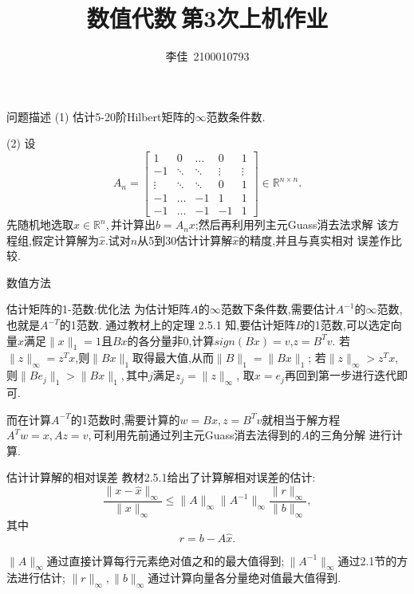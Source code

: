 \documentclass{article}
\title{数值代数$\ $第3次上机作业}
\author{李佳~2100010793}
\date{}
\begin{document}
\maketitle
\begin{section}{问题描述}
    \noindent(1) 估计5-20阶Hilbert矩阵的$\infty$范数条件数.
    
    \noindent(2) 设$$A_n = \begin{bmatrix}
        1 & 0 & \dots & 0 & 1\\
        -1 &\ddots &\ddots & \vdots &\vdots\\
        \vdots &\ddots & \ddots & 0 & 1\\
        -1&\dots & -1 & 1 & 1\\
        -1&\dots & -1 & -1 & 1
    \end{bmatrix}\in \mathbb{R}^{n\times n}.$$
    先随机地选取$x\in\mathbb{R}^n,$并计算出$b=A_nx$;然后再利用列主元Guass消去法求解
    该方程组,假定计算解为$\hat{x}$.试对$n$从5到30估计计算解$\hat{x}$的精度,并且与真实相对
    误差作比较.
\end{section}
\begin{section}{数值方法}
    \begin{subsection}{估计矩阵的1-范数:优化法}
        为估计矩阵$A$的$\infty$范数下条件数,需要估计$A^{-1}$的$\infty$范数,也就是$A^{-T}$的1范数.
        通过教材上的定理 2.5.1 知,要估计矩阵$B$的1范数,可以选定向量$x$满足$\lVert x\rVert_1=1$且$Bx$的各分量非0,计算$sign(Bx)=v$,$z=B^Tv$.
        若$\lVert z\rVert_{\infty}=z^Tx$,则$\lVert Bx\rVert_1$取得最大值,从而$\lVert B\rVert_1=\lVert Bx\rVert_1$;
        若$\lVert z\rVert_{\infty}>z^Tx$,则$\lVert Be_j\rVert_1>\lVert Bx\rVert_1,$其中$j$满足$z_j = \lVert z\rVert_{\infty}$,
        取$x=e_j$再回到第一步进行迭代即可.

        而在计算$A^{-T}$的1范数时,需要计算的$w=Bx,z=B^Tv$就相当于解方程$A^Tw=x,Az=v,$可利用先前通过列主元Guass消去法得到的$A$的三角分解
        进行计算.
    \end{subsection}
    \begin{subsection}{估计计算解的相对误差}
        教材2.5.1给出了计算解相对误差的估计:
        $$ \dfrac{\lVert x-\hat{x}\rVert_{\infty}}{\lVert x\rVert_{\infty}} \leq \lVert A\rVert_{\infty}\lVert A^{-1}\rVert_{\infty}\dfrac{\lVert r\rVert_{\infty}}{\lVert b\rVert_{\infty}},$$
        其中$$r=b-A\hat{x}.$$
        
        $\lVert A\rVert_{\infty}$通过直接计算每行元素绝对值之和的最大值得到;$\ \lVert A^{-1}\rVert_{\infty}$通过2.1节的方法进行估计;
        $\lVert r\rVert_{\infty},\lVert b\rVert_{\infty}$通过计算向量各分量绝对值最大值得到.
        
    \end{subsection}
\end{section}
\end{document}
